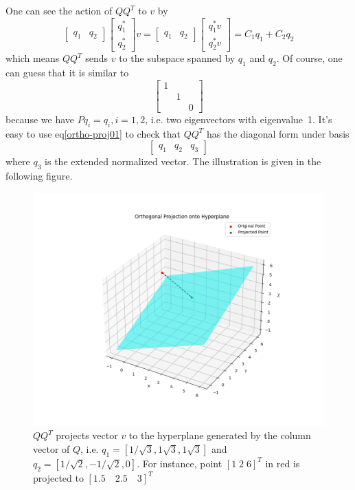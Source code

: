 \documentclass[dvipsnames, 12pt]{article}
\begin{document}
One can see the action of $QQ^{T}$ to $v$ by
\begin{equation}
\label{ortho-proj01}
\begin{bmatrix}
    q_{1} & q_{2}
\end{bmatrix} \begin{bmatrix}
    q_{1}^{*}\\
    q_{2}^{*}
\end{bmatrix} v = 
\begin{bmatrix}
    q_{1} & q_{2}
\end{bmatrix} \begin{bmatrix}
    q_{1}^{*}v\\
    q_{2}^{*}v 
\end{bmatrix} = C_{1} q_{1} + C_{2} q_{2}
\end{equation}
which means $QQ^{T}$ sends $v$ to the subspace spanned by $q_{1}$ and $q_{2}$. Of course, one can guess that it is similar to 
$$
\begin{bmatrix}
    1 & & \\
    & 1 & \\
    & & 0
\end{bmatrix}
$$
because we have $P q_{i} = q_{i}, i=1,2$, i.e. two eigenvectors with eigenvalue~1. It's easy to use eq\eqref{ortho-proj01} to check that $QQ^{T}$ has the diagonal form under basis
$$
\begin{bmatrix}
    q_{1} & q_{2} & q_{3}
\end{bmatrix}
$$
where $q_{3}$ is the extended normalized vector.  
The illustration is given in the following figure.
\begin{figure}[ht]
    \centering
    \includegraphics[width=0.6\linewidth]{illustrations/orthogonal_projection.png}
    \caption{$QQ^{T}$ projects vector $v$ to the hyperplane generated by the column vector of $Q$, i.e. $q_{1}=[1/\sqrt{3}, 1\sqrt{3}, 1\sqrt{3}]$ and $q_{2}=[1/\sqrt{2}, -1/\sqrt{2}, 0]$. For instance, point $[1\; 2\; 6]^{T}$ in red is projected to $[1.5\quad 2.5\quad 3]^{T}$}
    \label{fig:enter-label2}
\end{figure}
\end{document}

